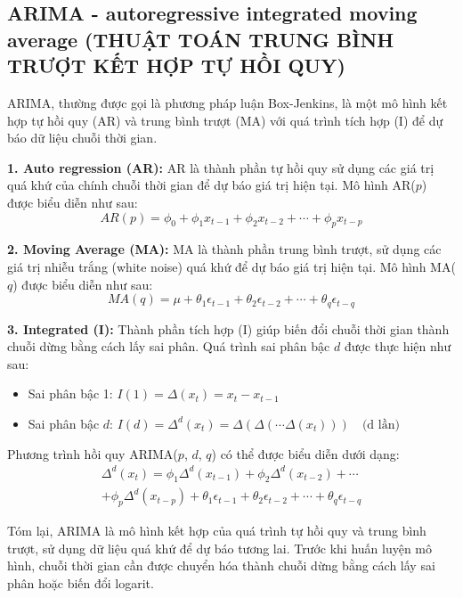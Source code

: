 \documentclass[conference]{IEEEtran}
\begin{document}
	\subsection{ARIMA - autoregressive integrated moving average (THUẬT TOÁN TRUNG BÌNH TRƯỢT KẾT HỢP TỰ HỒI QUY)}
	
	ARIMA, thường được gọi là phương pháp luận Box-Jenkins, là một mô hình kết hợp tự hồi quy (AR) và trung bình trượt (MA) với quá trình tích hợp (I) để dự báo dữ liệu chuỗi thời gian. 
	
	\textbf{1. Auto regression (AR):} 
	AR là thành phần tự hồi quy sử dụng các giá trị quá khứ của chính chuỗi thời gian để dự báo giá trị hiện tại. Mô hình AR($p$) được biểu diễn như sau:
	\begin{equation}
		AR(p) = \phi_0 + \phi_1 x_{t-1} + \phi_2 x_{t-2} + \cdots + \phi_p x_{t-p}
	\end{equation}
	
	\textbf{2. Moving Average (MA):}
	MA là thành phần trung bình trượt, sử dụng các giá trị nhiễu trắng (white noise) quá khứ để dự báo giá trị hiện tại. Mô hình MA($q$) được biểu diễn như sau:
	\begin{equation}
		MA(q) = \mu + \theta_1 \epsilon_{t-1} + \theta_2 \epsilon_{t-2} + \cdots + \theta_q \epsilon_{t-q}
	\end{equation}
	
	\textbf{3. Integrated (I):}
	Thành phần tích hợp (I) giúp biến đổi chuỗi thời gian thành chuỗi dừng bằng cách lấy sai phân. Quá trình sai phân bậc $d$ được thực hiện như sau:
	\begin{itemize}
		\item Sai phân bậc 1: $I(1) = \Delta(x_t) = x_t - x_{t-1}$
		\item Sai phân bậc $d$: $I(d) = \Delta^d(x_t) = \Delta(\Delta(\cdots \Delta(x_t))) \quad \text{(d lần)}$
	\end{itemize}
	
	Phương trình hồi quy ARIMA($p$, $d$, $q$) có thể được biểu diễn dưới dạng:
	\begin{multline}
		\Delta^d(x_t) = \phi_1 \Delta^d(x_{t-1}) + \phi_2 \Delta^d(x_{t-2}) + \cdots \\
		+ \phi_p \Delta^d(x_{t-p}) + \theta_1 \epsilon_{t-1} + \theta_2 \epsilon_{t-2} + \cdots + \theta_q \epsilon_{t-q}
	\end{multline}
	
	
	Tóm lại, ARIMA là mô hình kết hợp của quá trình tự hồi quy và trung bình trượt, sử dụng dữ liệu quá khứ để dự báo tương lai. Trước khi huấn luyện mô hình, chuỗi thời gian cần được chuyển hóa thành chuỗi dừng bằng cách lấy sai phân hoặc biến đổi logarit.
	
\end{document}
